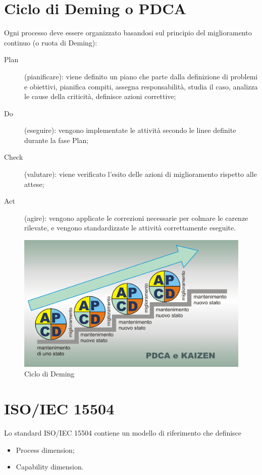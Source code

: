 \documentclass[PianoDiQualifica.tex]{subfiles}
\begin{document}
\begin{appendices}

\chapter{Ciclo di Deming o PDCA}
Ogni processo deve essere organizzato basandosi sul principio del miglioramento continuo (o ruota di Deming):
\begin{description}
	\item [Plan] (pianificare): viene definito un piano che parte dalla definizione di problemi e obiettivi, pianifica compiti, assegna responsabilità, studia il caso, analizza le cause della criticità, definisce azioni correttive; 
	\item [Do](eseguire): vengono implementate le attività secondo le linee definite durante la fase Plan;
	\item [Check] (valutare): viene verificato l'esito delle azioni di miglioramento rispetto alle attese;
	\item [Act] (agire): vengono applicate le correzioni necessarie per colmare le carenze rilevate, e vengono standardizzate le attività correttamente eseguite.
\end{description}

\begin{figure}[htbp]
	\begin{center}
		\includegraphics[width=0.7\linewidth]{../../common/images/PDCAkaizen}
		\caption[Ciclo di Deming]{Ciclo di Deming}
		\label{fig:pdca}
	\end{center}
\end{figure}

\chapter{ISO/IEC 15504}
Lo standard ISO/IEC 15504 contiene un modello di riferimento che definisce 
\begin{itemize}
	\item Process dimension;
	\item Capability dimension.
\end{itemize}


\end{appendices}
\end{document}
